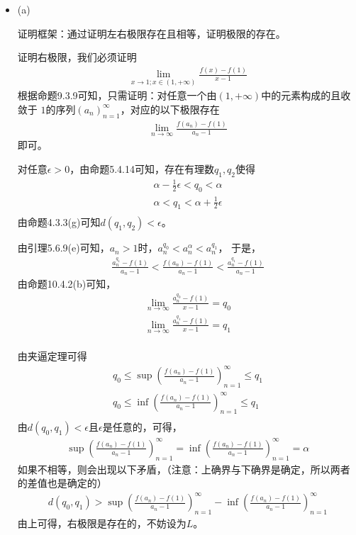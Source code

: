 \documentclass{article}
\begin{document}
\begin{itemize}
  \item (a)

        证明框架：通过证明左右极限存在且相等，证明极限的存在。

        证明右极限，我们必须证明
        \begin{align*}
          \lim\limits_{x \to 1; x \in (1, +\infty) } \frac{f(x) - f(1)}{x - 1}
        \end{align*}
        根据命题9.3.9可知，只需证明：对任意一个由$(1, +\infty)$中的元素构成的且收敛于
        $1$的序列$(a_n)_{n=1}^\infty$，对应的以下极限存在
        \begin{align*}
          \lim\limits_{n \to \infty} \frac{f(a_n) - f(1)}{a_n - 1}
        \end{align*}
        即可。

        对任意$\epsilon > 0$，由命题5.4.14可知，存在有理数$q_1, q_2$使得
        \begin{align*}
          \alpha - \frac{1}{2}\epsilon < q_0 < \alpha \\
          \alpha < q_1 < \alpha + \frac{1}{2}\epsilon \\
        \end{align*}
        由命题4.3.3(g)可知$d(q_1, q_2) < \epsilon$。

        由引理5.6.9(e)可知，$a_n > 1$时，$a_n^{q_0} < a_n^\alpha < a_n^{q_1}$，
        于是，
        \begin{align*}
          \frac{a_n^{q_1} - f(1)}{a_n - 1} < \frac{f(a_n) - f(1)}{a_n - 1} < \frac{a_n^{q_1} - f(1)}{a_n - 1}
        \end{align*}
        由命题10.4.2(b)可知，
        \begin{align*}
          \lim\limits_{n \to \infty} \frac{a_n^{q_0} - f(1)}{x - 1} = q_0 \\
          \lim\limits_{n \to \infty} \frac{a_n^{q_1} - f(1)}{x - 1} = q_1 \\
        \end{align*}

        由夹逼定理可得
        \begin{align*}
          q_0 \leq \sup(\frac{f(a_n) - f(1)}{a_n - 1})_{n=1}^\infty  \leq q_1 \\
          q_0 \leq \inf(\frac{f(a_n) - f(1)}{a_n - 1})_{n=1}^\infty  \leq q_1 \\
        \end{align*}
        由$d(q_0, q_1) < \epsilon$且$\epsilon$是任意的，可得，
        \begin{align*}
          \sup(\frac{f(a_n) - f(1)}{a_n - 1})_{n=1}^\infty = \inf(\frac{f(a_n) - f(1)}{a_n - 1})_{n=1}^\infty = \alpha
        \end{align*}
        如果不相等，则会出现以下矛盾，（注意：上确界与下确界是确定，所以两者的差值也是确定的）
        \begin{align*}
          d(q_0, q_1) > \sup(\frac{f(a_n) - f(1)}{a_n - 1})_{n=1}^\infty - \inf(\frac{f(a_n) - f(1)}{a_n - 1})_{n=1}^\infty
        \end{align*}
        由上可得，右极限是存在的，不妨设为$L$。


\end{itemize}
\end{document}
